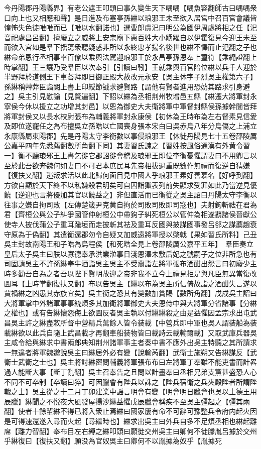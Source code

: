 今丹陽郡丹陽縣界】有老公遮王叩頭曰事久變生天下喁喁【喁魚容翻師古曰喁喁衆口向上也又相應和聲】是日進及布塞亭孫綝以琅邪王未至欲入居宫中召百官會議皆惶怖失色徒唯唯而已【唯以水翻諾也】選曹郎虞汜曰明公為國伊周處將相之任【汜音祀處昌呂翻】擅廢立之威將上安宗廟下惠百姓大小踴躍自以伊霍復見今迎王未至而欲入宮如是羣下揺蕩衆聽疑惑非所以永終忠孝揚名後世也綝不懌而止汜翻之子也綝命弟恩行丞相事率百僚以乘輿法駕迎琅邪王於永昌亭孫恩奉上璽符【乘繩證翻上時掌翻】王三讓乃受羣臣以次奉引【引讀曰靷】王就乘輿百官陪位綝以兵千人迎於半野拜於道側王下車荅拜即日御正殿大赦改元永安【吳主休字子烈吳主權第六子】孫綝稱艸莽臣詣闕上書上印綬節钺求避賢路【謂他有賢者進用恐妨其路求引身避之】吳主引見慰諭【見賢遍翻】下詔以綝為丞相荆州牧增邑五縣【綝遷大將軍封永寧侯今休以援立之功增其封邑】以恩為御史大夫衛將軍中軍督封縣侯孫據幹闓皆拜將軍封侯又以長水校尉張布為輔義將軍封永康侯【初休為王時布為左右督素見信愛及即位遂寵任之為布擅吳立孫皓以亡國喪身張本宋白曰吳赤烏八年分烏傷之上浦立永康縣屬東陽郡】先是丹陽太守李衡數以事侵琅邪王【休徙丹陽見七十五卷邵陵厲公嘉平四年先悉薦翻數所角翻下同】其妻習氏諫之【習姓按風俗通漢有外黄令習一】衡不聽琅邪王上書乞徙它郡詔徙會稽及琅邪王即位李衡憂懼謂妻曰不用卿言以至於此吾欲奔魏何如妻曰不可君本庶民耳先帝相拔過重既數作無禮而復逆自猜嫌【復扶又翻】逃叛求活以此北歸何面目見中國人乎琅邪王素好善慕名【好呼到翻】方欲自顯於天下終不以私嫌殺君明矣可自囚詣獄表列前失顯求受罪如此乃當逆見優饒【逆迎也言將優加其官以饒益之】非但直活而已衡從之吳主詔曰丹陽太守李衡以往事之嫌自拘司敗【左傳楚箴尹克黄自拘於司敗司敗即司寇也】夫射鉤斬祛在君為君【齊桓公與公子糾爭國管仲射桓公中帶鉤子糾死桓公以管仲為相遂覇諸侯晉獻公使寺人披伐蒲公子重耳踰垣而走披斬其袪及重耳反國與披謀國事發呂郤之謀薦趙衰守原為于偽翻】其遣衡還郡勿令自疑又加威遠將軍授以棨戟【果如習氏所料】己丑吳主封故南陽王和子皓為烏程侯【和死皓全見上卷邵陵厲公嘉平五年】　羣臣奏立皇后太子吳主曰朕以寡德奉承洪業涖事日淺恩澤未敷后妃之號嗣子之位非所急也有司固請吳主不許孫綝奉牛酒詣吳主吳主不受齎詣左將軍張布酒酣出怨言曰初廢少主時多勸吾自為之者吾以陛下賢明故迎之帝非我不立今上禮見拒是與凡臣無異當復改圖耳【上時掌翻復扶又翻】布以告吳主【綝以布為吳主所信倚故詣之酒酣失言遂以賈禍綝之凶愚其赤族宜矣】吳主銜之恐其有變數加賞賜【數所角翻】戊戍吳主詔曰大將軍掌中外諸軍事事統煩多其加衛將軍御史大夫恩侍中與大將軍分省諸事【分綝之權也】或有告綝懷怨侮上欲圖反者吳主執以付綝綝殺之由是益懼因孟宗求出屯武昌吳主許之綝盡敕所督中營精兵萬餘人皆令装載【中營兵即中軍也吳人謂装船為装載綝欲以此兵自隨上武昌載才再翻車船装物皆曰載詩云載輸爾載】又取武庫兵器吳主咸令給與綝求中書兩郎典知荆州諸軍事主者奏中書不應外出吳主特聽之其所請求一無違者將軍魏邈說吳主曰綝居外必有變【說輸芮翻】武衛士施朔又告綝謀反【武衛士武衛之士也】吳主將討綝密問輔義將軍張布布曰左將軍丁奉雖不能吏書而計畧過人能斷大事【斷丁亂翻】吳主召奉告之且問以計畫奉曰丞相兄弟支黨甚盛恐人心不同不可卒制【卒讀曰猝】可因臘會有陛兵以誅之【陛兵宿衛之兵夾殿陛者所謂陛戟之士】吳主從之十二月丁卯建業中謡言明會有變【明會明日臘會也吳以土德王用辰臘】綝聞之不悦夜大風發屋揚沙綝益懼戊辰臘會稱疾不至吳主彊起之【彊其兩翻】使者十餘輩綝不得已將入衆止焉綝曰國家屢有命不可辭可豫整兵令府内起火因是可得速還遂入尋而火起【尋繼時也】綝求出吳主曰外兵自多不足煩丞相也綝起離席【離力智翻】奉布目左右縛之綝叩頭曰願徙交州吳主曰卿何不徙滕胤呂據於交州乎綝復曰【復扶又翻】願没為官奴吳主曰卿何不以胤據為奴乎【胤據死